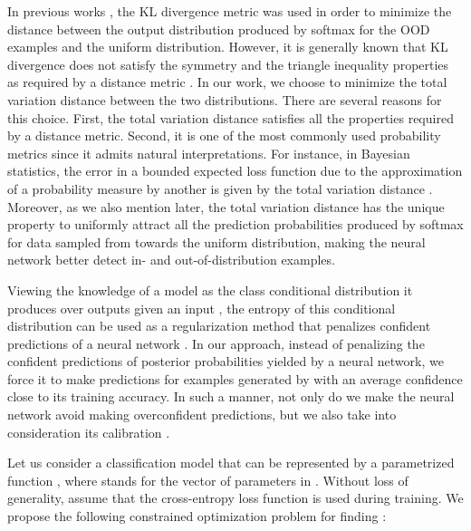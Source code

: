 \documentclass{article} \usepackage{iclr2020_conference,times}
\begin{document}
In previous works \citep{2017arXiv171109325L, hendrycks2019oe}, the KL divergence metric was used in order to minimize the distance between the output distribution produced by softmax for the OOD examples and the uniform distribution. However, it is generally known that KL divergence does not satisfy the symmetry and the triangle inequality properties as required by a distance metric \citep{Gibbs02onchoosing,Deza.Deza2009EncyclopediaofDistances}. 
In our work, we choose to minimize the total variation distance \citep{Gibbs02onchoosing} between the two distributions. There are several reasons for this choice. First, the total variation distance satisfies all the properties required by a distance metric. Second, it is one of the most commonly
used probability metrics since it admits natural interpretations. For instance, in Bayesian statistics, the error in a bounded expected loss function due to the approximation of a probability measure by another is given by the total
variation distance \citep{Gibbs02onchoosing}. Moreover, as we also mention later, the total variation distance has the unique property to uniformly attract all the prediction probabilities produced by softmax for data sampled from  towards the uniform distribution, making the neural network better detect in- and out-of-distribution examples.

Viewing the knowledge of a model as the class conditional distribution it produces over outputs given an input \citep{HinVin15Distilling}, the entropy of this conditional distribution can be used as a regularization method that penalizes confident predictions of a neural network \citep{DBLP:conf/iclr/PereyraTCKH17}. In our approach, instead of penalizing the confident predictions of posterior probabilities yielded by a neural network, we force it to make predictions for examples generated by  with an average confidence close to its training accuracy. In such a manner, not only do we make the neural network avoid making overconfident predictions, but we also take into consideration its calibration \citep{Guo:2017:CMN:3305381.3305518}.

Let us consider a classification model that can be represented by a parametrized function , where  stands for the vector of parameters in . Without loss of generality, assume that the cross-entropy loss function is used during training. We propose the following constrained optimization problem for finding :
\end{document}
